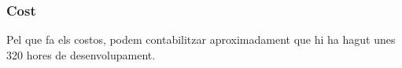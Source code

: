 \subsubsection{Cost} %
\label{ssub:Cost}

Pel que fa els costos, podem contabilitzar aproximadament que hi ha hagut unes
320 hores de desenvolupament.

%
